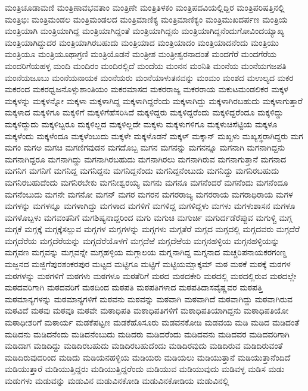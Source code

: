 {ಮಂತ್ರಿಚೂಡಾಮಣಿ
ಮಂತ್ರಿಣಾವಭವತಾಂ
ಮಂತ್ರಿಣೇ
ಮಂತ್ರಿತಿಳಕಂ
ಮಂತ್ರಿಪದವಿಯಲ್ಲಿದ್ದಿರ
ಮಂತ್ರಿಪರಿಷತ್ತಿನಲ್ಲಿ
ಮಂತ್ರಿಭಿಃ
ಮಂತ್ರಿಮಂಡಲ
ಮಂತ್ರಿಮಂಡಲದ
ಮಂತ್ರಿಮಾಣಿಕ್ಯ
ಮಂತ್ರಿಮಾಣಿಕ್ಯಂ
ಮಂತ್ರಿಮುಖದರ್ಪಣ
ಮಂತ್ರಿಯ
ಮಂತ್ರಿಯಾಗಿ
ಮಂತ್ರಿಯಾಗಿದ್ದ
ಮಂತ್ರಿಯಾಗಿದ್ದಂತೆ
ಮಂತ್ರಿಯಾಗಿದ್ದನು
ಮಂತ್ರಿಯಾಗಿದ್ದನೆಂದುಗೋವಿಂದಯ್ಯಾಖ್ಯ
ಮಂತ್ರಿಯಾಗಿದ್ದುದರ
ಮಂತ್ರಿಯಾಗಿರಬಹುದು
ಮಂತ್ರಿಯಾದ
ಮಂತ್ರಿಯಾದಂ
ಮಂತ್ರಿಯಾದನೆಂದು
ಮಂತ್ರಿಯು
ಮಂತ್ರಿಯೂ
ಮಂತ್ರಿಯೂಥಾಗ್ರಣಿ
ಮಂತ್ರಿಯೊಡನೆ
ಮಂತ್ರೀಶ
ಮಂತ್ರೀಶ್ವರನಾದಂತೆ
ಮಂದಗೆರೆ
ಮಂದಗೆರೆಯ
ಮಂದರಿಗೆಯಹಳ್ಳ
ಮಂದಿ
ಮಂದಿರಂ
ಮಂದಿರಲ್ಲಿದೆ
ಮಂದೆಯ
ಮಂನನ
ಮಂನಿತಿ
ಮಂನೆಯ
ಮಂನೆಯಗಜಪತಿ
ಮಂನೆಯಜೂಬು
ಮಂನೆಯನಾಯಕ
ಮಂನೆಯರು
ಮಂನೆಯಾಳುತನವನ್ನು
ಮಂಮಂ
ಮಂಶದ
ಮಉಲ್ಯದ
ಮಕರ
ಮಕರಂದ
ಮಕರಧ್ವಜನೊಳ್ಸುಶಾಂತಿಯಂ
ಮಕರಮಾಸದ
ಮಕರರಾಜ್ಯ
ಮಕರರಾಯ
ಮಕುಟಮಂಡಲಿಕರ
ಮಕ್ಕಳ
ಮಕ್ಕಳನ್ನು
ಮಕ್ಕಳನ್ನೋ
ಮಕ್ಕಳಾ
ಮಕ್ಕಳಾಗಿದ್ದ
ಮಕ್ಕಳಾಗಿದ್ದರೆಂದು
ಮಕ್ಕಳಾಗಿದ್ದು
ಮಕ್ಕಳಾಗಿರಬಹುದು
ಮಕ್ಕಳಾಗುತ್ತಾರೆ
ಮಕ್ಕಳಾದ
ಮಕ್ಕಳಿಗೂ
ಮಕ್ಕಳಿಗೆ
ಮಕ್ಕಳಿಗೆಹೆಸರಿಸಿದೆ
ಮಕ್ಕಳಿದ್ದರು
ಮಕ್ಕಳಿದ್ದರೆಂದು
ಮಕ್ಕಳಿದ್ದರೆಂದೂ
ಮಕ್ಕಳಿದ್ದು
ಮಕ್ಕಳಿದ್ದುದು
ಮಕ್ಕಳಿಬ್ಬರೂ
ಮಕ್ಕಳಿಲ್ಲದ
ಮಕ್ಕಳಿಲ್ಲದೇ
ಮಕ್ಕಳು
ಮಕ್ಕಳುಗಳಿಗೂ
ಮಕ್ಕಳುಚಿಸೆಟ್ಟಿಯ
ಮಕ್ಕಳೂ
ಮಕ್ಕಳೆಂದು
ಮಕ್ಕಳೆಂದೂ
ಮಕ್ಕಳೆಂಬುದು
ಮಕ್ಕಳೇ
ಮಕ್ಕಳೊಡನೆ
ಮಕ್ಕಳ್
ಮಕ್ಕಾನ್
ಮಖ್ಖಳು
ಮಖ್ಯಸ್ಥರಾಗಿದ್ದರು
ಮಗ
ಮಗಂ
ಮಗಅ
ಮಗಚಿ
ಮಗಣಿಗವುಡನ
ಮಗದೊಬ್ಬ
ಮಗನ
ಮಗನನ್ನು
ಮಗನನ್ನೂ
ಮಗನಾಗಿ
ಮಗನಾಗಿದ್ದನು
ಮಗನಾಗಿದ್ದರೂ
ಮಗನಾಗಿದ್ದು
ಮಗನಾಗಿರಬಹುದು
ಮಗನಾಗಿರಲು
ಮಗನಾಗಿರುವ
ಮಗನಾಗುತ್ತಾನೆ
ಮಗನಾದ
ಮಗನಿಗ
ಮಗನಿಗೆ
ಮಗನಿದ್ದ
ಮಗನಿದ್ದನು
ಮಗನಿದ್ದನೆಂದು
ಮಗನಿದ್ದನೆಂಬುದು
ಮಗನಿದ್ದು
ಮಗನಿರಬಹುದು
ಮಗನಿರಬಹುದೆಂದು
ಮಗನಿರಬೇಕು
ಮಗನೀಶ್ವರಯ್ಯ
ಮಗನು
ಮಗನೂ
ಮಗನೆಂದರೆ
ಮಗನೆಂದು
ಮಗನೆಂದೂ
ಮಗನೆಂಬುದು
ಮಗನೇ
ಮಗನೋ
ಮಗನ್
ಮಗರ
ಮಗರನ
ಮಗರರಾಜ್ಯ
ಮಗರರಾಯ
ಮಗರಾಧಿರಾಯ
ಮಗಳ
ಮಗಳನ್ನು
ಮಗಳನ್ನೂ
ಮಗಳಾಗಿದ್ದು
ಮಗಳಾದ
ಮಗಳಿಗೆ
ಮಗಳಿದ್ದ
ಮಗಳಿದ್ದಳು
ಮಗಳು
ಮಗಳುಶಾಸನ
ಮಗಳೂ
ಮಗಳೊಬ್ಬಳು
ಮಗವಂತನಿಗೆ
ಮಗಶಿಷ್ಯನಾದ್ದರಿಂದ
ಮಗು
ಮಗುಚಿ
ಮಗುರ್ಚಿ
ಮಗುರ್ದಡೆರೆಪ್ಪುವ
ಮಗುಳ್ಚಿ
ಮಗ್ಗ
ಮಗ್ಗಕೆ
ಮಗ್ಗಕ್ಕೆ
ಮಗ್ಗಕ್ಕೆಸಲ್ಲುವ
ಮಗ್ಗಗಳ
ಮಗ್ಗಗಳನ್ನು
ಮಗ್ಗಗಳು
ಮಗ್ಗತೆರೆ
ಮಗ್ಗದ
ಮಗ್ಗದಲ್ಲಿ
ಮಗ್ಗದವರು
ಮಗ್ಗದೆರೆ
ಮಗ್ಗದೆರೆಯ
ಮಗ್ಗದೆರೆಯನ್ನು
ಮಗ್ಗದೆರೆಯೊಳಗೆ
ಮಗ್ಗದೆಱೆ
ಮಗ್ಗದೆಱೆಯ
ಮಗ್ಗನಹಳ್ಳಿಯ
ಮಗ್ಗನಹಳ್ಳಿಯನ್ನು
ಮಗ್ಗವಣ
ಮಗ್ಗವನ್ನು
ಮಗ್ಗವನ್ನೇ
ಮಗ್ಗಹಳ್ಳಿಯ
ಮಗ್ಗಾಲಯ
ಮಗ್ನನಾಗಿದ್ದ
ಮಗ್ನನಾದ
ಮಚ್ಚರಿಪನಾಯಕರಗಂಣ್ಡ
ಮಜ್ಜನದ
ಮಜ್ಜಿಗೆಪುರಶಂಕರಪುರ
ಮಟ್ಟದ
ಮಟ್ಟಿಗೂ
ಮಟ್ಟಿಗೆ
ಮಟ್ಟಿಯಮ್ಬಾಕ್ಕಮ್
ಮಠ
ಮಠಕೆ
ಮಠಕ್ಕೆ
ಮಠಗಳ
ಮಠಗಳನ್ನು
ಮಠಗಳಿಗೆ
ಮಠಗಳು
ಮಠಗಳೂ
ಮಠತೆರಿಗೆ
ಮಠದ
ಮಠದಕೇರಿ
ಮಠದಲ್ಲಿ
ಮಠದಲ್ಲಿರುವ
ಮಠದಲ್ಲೇ
ಮಠದವರಿಗಾಗಿ
ಮಠದವರಿಗೆ
ಮಠದಿಂದ
ಮಠಪತಿ
ಮಠಪತಿಗಳಾದ
ಮಠಪತಿದಾಸವೈಷ್ಣವರ
ಮಠಪತ್ತಿ
ಮಠಮಾನ್ಯಗಳನ್ನು
ಮಠಮಾನ್ಯಗಳಿಗೆ
ಮಠವನು
ಮಠವನ್ನು
ಮಠವಾಗಿ
ಮಠವಾಗಿದೆ
ಮಠವಾಗಿದ್ದು
ಮಠವಾಗಿರುವ
ಮಠವಿದೆ
ಮಠವು
ಮಠವೂ
ಮಠವೇ
ಮಠಾಧಿಪತಿ
ಮಠಾಧಿಪತಿಗಳಿಗೆ
ಮಠಾಧಿಪತಿಯಾಗಿದ್ದನು
ಮಠಾಧಿಪತಿಯೋ
ಮಠಾಧೀಶರಿಗೆ
ಮಠಾರ್ಯ
ಮಡಕೆಪಟ್ಟಣ
ಮಡಕೆಹೊಸೂರು
ಮಡವನಕೋಡಿ
ಮಡವಯ
ಮಡಿ
ಮಡಿದ
ಮಡಿದಂತೆ
ಮಡಿದನು
ಮಡಿದನೆಂದು
ಮಡಿದನೆಂಬುದು
ಮಡಿದರು
ಮಡಿದರೆಂದು
ಮಡಿದವನು
ಮಡಿದವರ
ಮಡಿದವರಿಗಾಗಿ
ಮಡಿದಾಗ
ಮಡಿದಿದ್ದು
ಮಡಿದಿರಬಹುದು
ಮಡಿದಿರಬಹುದೆಂದು
ಮಡಿದಿರವುದು
ಮಡಿದಿರುವ
ಮಡಿದಿರುವಂತೆ
ಮಡಿದಿರುವುದರಿಂದ
ಮಡಿದು
ಮಡಿಯನಹಳ್ಳಿಯ
ಮಡಿಯರು
ಮಡಿಯಲು
ಮಡಿಯುತ್ತಾನೆ
ಮಡಿಯುತ್ತಾನೆಂದಿದೆ
ಮಡಿಯುತ್ತಾರೆ
ಮಡಿಯುತ್ತಿದ್ದರು
ಮಡಿಯುತ್ತಿದ್ದರೆಂದು
ಮಡಿಯುವ
ಮಡಿಯುವುದು
ಮಡಿವಳ್ಳ
ಮಡಿಸ
ಮಡು
ಮಡುಗಳು
ಮಡುವನ್ನು
ಮಡುವಿನ
ಮಡುವಿನಕೋಡಿ
ಮಡುವಿನಕೋಡಿಯ
ಮಡುವಿನಲ್ಲಿ
}

